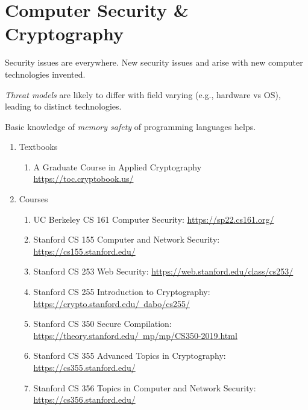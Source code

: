 \documentclass{article}
\begin{document}
\section{Computer Security \& Cryptography}
Security issues are everywhere.
New security issues and arise with new computer technologies invented.

\emph{Threat models} are likely to differ with field varying (e.g., hardware vs OS), leading to distinct technologies.

Basic knowledge of \emph{memory safety} of programming languages helps.

\begin{enumerate}
    \item Textbooks
    \begin{enumerate}
        \item A Graduate Course in
Applied Cryptography\\
        \href{https://toc.cryptobook.us/}{https://toc.cryptobook.us/}
    \end{enumerate}
    \item Courses
    \begin{enumerate}
        \item UC Berkeley CS 161 Computer Security:
        \href{https://sp22.cs161.org/}{https://sp22.cs161.org/}
        \item Stanford CS 155 Computer and Network Security:
        \href{https://cs155.stanford.edu/}{https://cs155.stanford.edu/}
        \item Stanford CS 253 Web Security:
        \href{https://web.stanford.edu/class/cs253/}{https://web.stanford.edu/class/cs253/}
        \item Stanford CS 255 Introduction to Cryptography:
        \href{https://crypto.stanford.edu/~dabo/cs255/}{https://crypto.stanford.edu/~dabo/cs255/}
        \item Stanford CS 350 Secure Compilation:\\
        \href{https://theory.stanford.edu/~mp/mp/CS350-2019.html}{https://theory.stanford.edu/~mp/mp/CS350-2019.html}
        \item Stanford CS 355 Advanced Topics in Cryptography:\\
        \href{https://cs355.stanford.edu/}{https://cs355.stanford.edu/}
        \item Stanford CS 356 Topics in Computer and Network Security:
        \href{https://cs356.stanford.edu/}{https://cs356.stanford.edu/}    \end{enumerate}


\end{enumerate}
\end{document}
